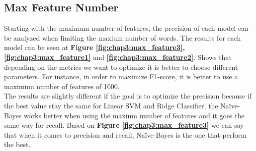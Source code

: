 \subsection{Max Feature Number}

Starting with the maximum number of features, the precision of each model can be analyzed when limiting the maxium number of words. The results for each model can be seen at \textbf{Figure \ref{fig:chap3:max_feature3}, \ref{fig:chap3:max_feature1}} and \textbf{\ref{fig:chap3:max_feature2}}. Shows that depending on the metrics we want to optimize it is better to choose different parameters. For instance, in order to maximize F1-score, it is better to use a maximum number of features of 1000.\\

The results are slightly different if the goal is to optimize the precision because if the best value stay the same for Linear SVM and Ridge Classifier, the Na\"{i}ve-Bayes works better when using the maxium number of features and it goes the same way for recall. 
Based on \textbf{Figure \ref{fig:chap3:max_feature3}} we can say that when it comes to precision and recall, Na\"{i}ve-Bayes is the one that perform the best.\\

